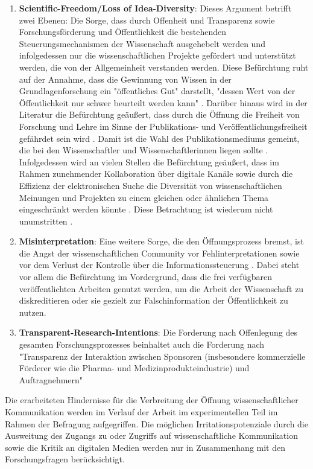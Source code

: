 \begin{enumerate}
\item \textbf{Scientific-Freedom/Loss of Idea-Diversity}: Dieses Argument betrifft zwei Ebenen: Die Sorge, dass durch Offenheit und Transparenz sowie Forschungsförderung und Öffentlichkeit die bestehenden Steuerungsmechanismen der Wissenschaft ausgehebelt werden und infolgedessen nur die wissenschaftlichen Projekte gefördert und unterstützt werden, die von der Allgemeinheit verstanden werden. Diese Befürchtung ruht auf der Annahme, dass die Gewinnung von Wissen in der Grundlagenforschung ein "öffentliches Gut" darstellt, "dessen Wert von der Öffentlichkeit nur schwer beurteilt werden kann" \cite{Osterloh_2008}. Darüber hinaus wird in der Literatur die Befürchtung geäußert, dass durch die Öffnung die Freiheit von Forschung und Lehre im Sinne der Publikations- und Veröffentlichungsfreiheit gefährdet sein wird \cite{Jochum_2009}. Damit ist die Wahl des Publikationsmediums gemeint, die bei den Wissenschaftler und Wissenschaftlerinnen liegen sollte \cite{BBAW_2015}. Infolgedessen wird an vielen Stellen die Befürchtung geäußert, dass im Rahmen zunehmender Kollaboration über digitale Kanäle sowie durch die Effizienz der elektronischen Suche die Diversität von wissenschaftlichen Meinungen und Projekten zu einem gleichen oder ähnlichen Thema eingeschränkt werden könnte \cite{Evans_2008}. Diese Betrachtung ist wiederum nicht unumstritten \cite{Lariviere_2009}.
\item \textbf{Misinterpretation}: Eine weitere Sorge, die den Öffnungsprozess bremst, ist die Angst der wissenschaftlichen Community vor Fehlinterpretationen \cite{Grand_2012} sowie vor dem Verlust der Kontrolle über die Informationssteuerung \cite{Gibbons_1994}. Dabei steht vor allem die Befürchtung im Vordergrund, dass die frei verfügbaren veröffentlichten Arbeiten genutzt werden, um die Arbeit der Wissenschaft zu diskreditieren oder sie gezielt zur Falschinformation der Öffentlichkeit zu nutzen.
\item \textbf{Transparent-Research-Intentions}: Die Forderung nach Offenlegung des gesamten Forschungsprozesses beinhaltet auch die Forderung nach "Transparenz der Interaktion zwischen Sponsoren (insbesondere kommerzielle Förderer wie die Pharma- und Medizinprodukteindustrie) und Auftragnehmern" \cite{Stengel_2013}
\end{enumerate}

Die erarbeiteten Hindernisse für die Verbreitung der Öffnung wissenschaftlicher Kommunikation werden im Verlauf der Arbeit im experimentellen Teil im Rahmen der Befragung aufgegriffen. Die möglichen Irritationspotenziale durch die Ausweitung des Zugangs zu oder Zugriffs auf wissenschaftliche Kommunikation sowie die Kritik an digitalen Medien werden nur in Zusammenhang mit den Forschungsfragen berücksichtigt.

